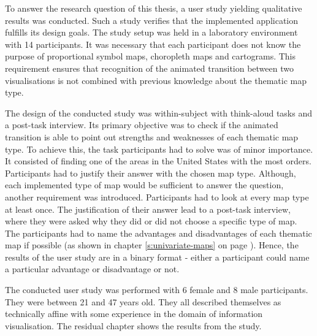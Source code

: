 To answer the research question of this thesis, a user study yielding qualitative results was conducted. Such a study verifies that the implemented application fulfills its design goals.
The study setup was held in a laboratory environment with 14 participants. It was necessary that each participant does not know the purpose of proportional symbol maps, choropleth maps and cartograms. This requirement ensures that recognition of the animated transition between two visualisations is not combined with previous knowledge about the thematic map type.

The design of the conducted study was within-subject with think-aloud tasks and a post-task interview. Its primary objective was to check if the animated transition is able to point out strengths and weaknesses of each thematic map type. To achieve this, the task participants had to solve was of minor importance. It consisted of finding one of the areas in the United States with the most orders. Participants had to justify their answer with the chosen map type. Although, each implemented type of map would be sufficient to answer the question, another requirement was introduced. Participants had to look at every map type at least once. The justification of their answer lead to a post-task interview, where they were asked why they did or did not choose a specific type of map. The participants had to name the advantages and disadvantages of each thematic map if possible (as shown in chapter \ref{s:univariate-maps} on page \pageref{s:univariate-maps}). Hence, the results of the user study are in a binary format - either a participant could name a particular advantage or disadvantage or not.

The conducted user study was performed with 6 female and 8 male participants. They were between 21 and 47 years old. They all described themselves as technically affine with some experience in the domain of information visualisation. The residual chapter shows the results from the study.


